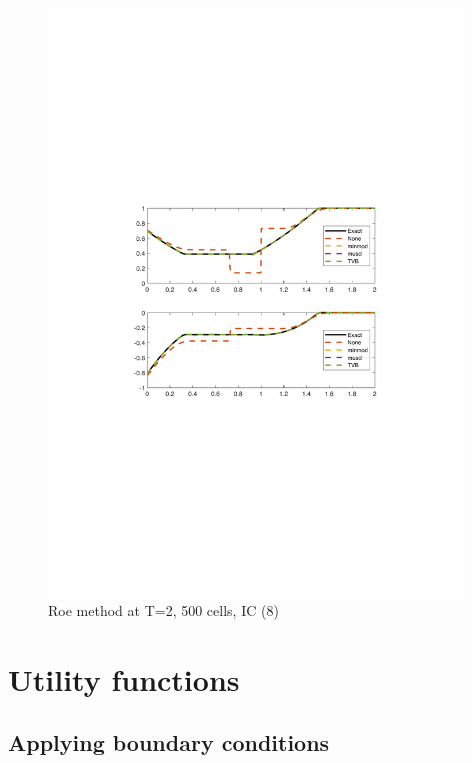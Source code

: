 \documentclass[11pt,a4paper]{article}
\renewcommand{\thesubsection}{\thesection.\alph{subsection}}
\newcommand\blankpage{%
    \null
    \newpage}
\begin{document}
\begin{figure}[!htb]
    \centering
    \includegraphics[width=11cm]{2_3_a_Roe.pdf}
    \caption{Roe method at T=2, 500 cells, IC (8)}
    \label{fig:Roe_IC_4}
\end{figure}




\afterpage{\blankpage}
\afterpage{\blankpage}
\afterpage{\blankpage}
\afterpage{\blankpage}
\afterpage{\blankpage}
\afterpage{\blankpage}

\newpage
\appendix
\renewcommand{\thesubsection}{\thesection.\arabic{subsection}}
\lstset{inputpath=m}

\section{Utility functions}\label{utility}

\subsection{Applying boundary conditions}\label{BC}

\end{document}

